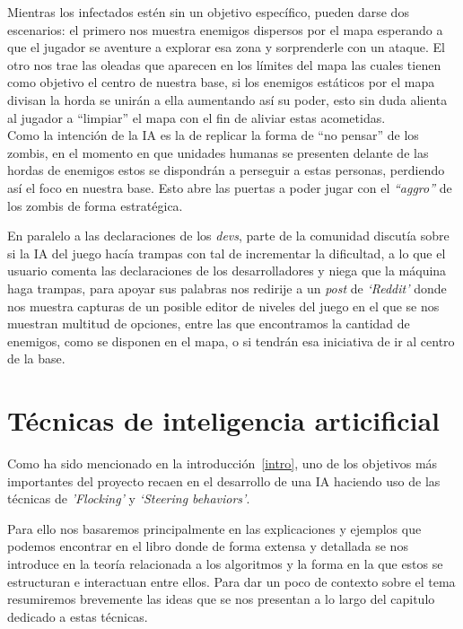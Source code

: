 Mientras los infectados estén sin un objetivo específico, pueden darse dos escenarios:
el primero nos muestra enemigos dispersos por el mapa esperando a que el jugador se aventure
a explorar esa zona y sorprenderle con un ataque. El otro nos trae las oleadas que aparecen
en los límites del mapa las cuales tienen como objetivo el centro de nuestra base, si los
enemigos estáticos por el mapa divisan la horda se unirán a ella aumentando así su poder, esto
sin duda alienta al jugador a ``limpiar'' el mapa con el fin de aliviar estas acometidas.\\
Como la intención de la \ac{IA} es la de replicar la forma de ``no pensar'' de los zombis, en
el momento en que unidades humanas se presenten delante de las hordas de enemigos estos se
dispondrán a perseguir a estas personas, perdiendo así el foco en nuestra base. Esto abre las
puertas a poder jugar con el \textit{``aggro''} de los zombis de forma estratégica.

En paralelo a las declaraciones de los \textit{devs}, parte de la comunidad discutía sobre si
la \ac{IA} del juego hacía trampas con tal de incrementar la dificultad, a lo que el usuario
\citeauthor*{Steam_User2019} comenta las declaraciones de los desarrolladores y niega que la
máquina haga trampas, para apoyar sus palabras nos redirije a un \textit{post} de \textit{`Reddit'}
donde \citeauthor*{Pikachunet2018} nos muestra capturas de un posible editor de niveles del
juego en el que se nos muestran multitud de opciones, entre las que encontramos la cantidad de
enemigos, como se disponen en el mapa, o si tendrán esa iniciativa de ir al centro de la base.


\section{Técnicas de inteligencia articificial}
Como ha sido mencionado en la introducción~\ref{intro}, uno de los objetivos más importantes 
del proyecto recaen en el desarrollo de una \ac{IA} haciendo uso de las técnicas de 
\textit{'Flocking'} y \textit{`Steering behaviors'}.

Para ello nos basaremos principalmente en las explicaciones y ejemplos que podemos
encontrar en el libro \cite[ch.~3]{Millington2009} donde de forma extensa y detallada
se nos introduce en la teoría relacionada a los algoritmos y la forma en la que estos
se estructuran e interactuan entre ellos. Para dar un poco de contexto sobre el tema
resumiremos brevemente las ideas que se nos presentan a lo largo del capitulo dedicado
a estas técnicas. 

